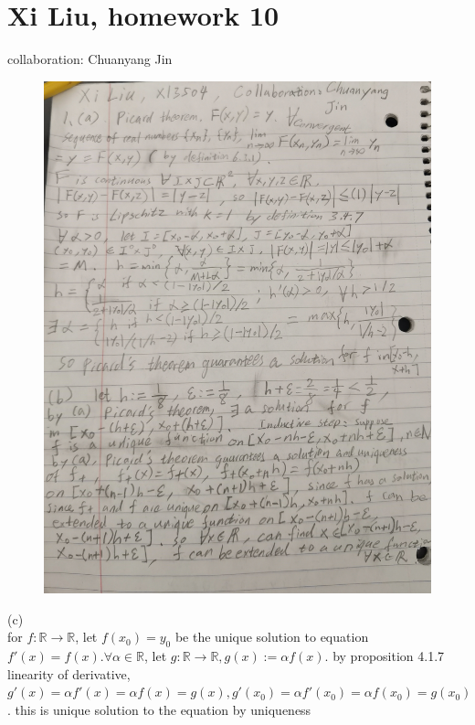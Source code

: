 \documentclass[12pt, border = 4pt, multi]{article} %
\begin{document}
\section*{Xi Liu, homework 10}
collaboration: Chuanyang Jin
\begin{figure}[h!]
	\centering
	\includegraphics[width = \textwidth, height = 1.4\textwidth]{0.jpg}
\end{figure}
\newpage
\noindent
(c)\\
for $f: \mathbb{R} \rightarrow \mathbb{R}$, let $f(x_0) = y_0$ be the unique solution to equation $f'(x) = f(x). \forall \alpha \in \mathbb{R}$, let $g: \mathbb{R} \rightarrow \mathbb{R}, g(x) := \alpha f(x)$. by proposition 4.1.7 linearity of derivative, $g'(x) = \alpha f'(x) = \alpha f(x) = g(x), g'(x_0) = \alpha f'(x_0) = \alpha f(x_0) = g(x_0)$. this is unique solution to the equation by uniqueness\\
\\
\end{document}
